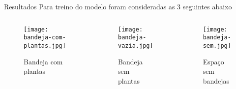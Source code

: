 \begin{frame}[t]{Resultados}
    Para treino do modelo foram consideradas as 3 seguintes abaixo
    \begin{columns}[t]
        \begin{center}
                \begin{figure}
                    \texttt{[image: bandeja-com-plantas.jpg]}
                    \caption{Bandeja com plantas}
                \end{figure}
        \end{center}

        \begin{center}
                \begin{figure}
                    \texttt{[image: bandeja-vazia.jpg]}
                    \caption{Bandeja sem plantas}
                \end{figure}
        \end{center}

        \begin{center}
                \begin{figure}
                    \texttt{[image: bandeja-sem.jpg]}
                    \caption{Espaço sem bandejas}
                \end{figure}
        \end{center}
    \end{columns}
\end{frame}



